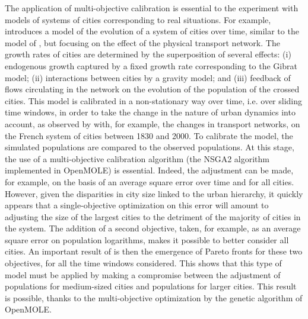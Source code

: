 \documentclass[10pt]{article}
\begin{document}
The application of multi-objective calibration is essential to the experiment with models of systems of cities corresponding to real situations. For example, \cite{raimbault2018indirect} introduces a model of the evolution of a system of cities over time, similar to the model of \cite{favaro2011gibrat}, but focusing on the effect of the physical transport network. The growth rates of cities are determined by the superposition of several effects: (i) endogenous growth captured by a fixed growth rate corresponding to the Gibrat model; (ii) interactions between cities by a gravity model; and (iii) feedback of flows circulating in the network on the evolution of the population of the crossed cities. This model is calibrated in a non-stationary way over time, i.e. over sliding time windows, in order to take the change in the nature of urban dynamics into account, as observed by \cite{bretagnolle2018vers} with, for example, the changes in transport networks, on the French system of cities between 1830 and 2000. To calibrate the model, the simulated populations are compared to the observed populations. At this stage, the use of a multi-objective calibration algorithm (the NSGA2 algorithm implemented in OpenMOLE) is essential. Indeed, the adjustment can be made, for example, on the basis of an average square error over time and for all cities. However, given the disparities in city size linked to the urban hierarchy, it quickly appears that a single-objective optimization on this error will amount to adjusting the size of the largest cities to the detriment of the majority of cities in the system. The addition of a second objective, taken, for example, as an average square error on population logarithms, makes it possible to better consider all cities. An important result of \cite{raimbault2018indirect} is then the emergence of Pareto fronts for these two objectives, for all the time windows considered. This shows that this type of model must be applied by making a compromise between the adjustment of populations for medium-sized cities and populations for larger cities. This result is possible, thanks to the multi-objective optimization by the genetic algorithm of OpenMOLE.
\end{document}
